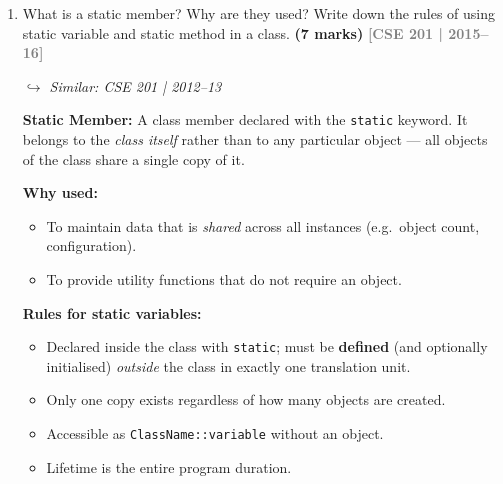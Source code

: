 \documentclass[12pt,a3paper]{article}
\newcommand{\yr}[1]{\hfill\textcolor{gray}{\small\textbf{[#1]}}}
\newcommand{\mk}[1]{\textcolor{orange!70!black}{\small\textbf{(#1 marks)}}}
\newcommand{\variant}[1]{\par\vspace{1pt}\textcolor{blue!50!black}%
  {\footnotesize\textit{$\hookrightarrow$ Similar: #1}}}
\begin{document}
\begin{enumerate}
\begin{tcolorbox}[enhanced,breakable,ansbox,colback=cB!4,colframe=cB,
  boxrule=0.8pt,arc=5pt,
  title={\textbf{Answer}},fonttitle=\bfseries\color{white},colbacktitle=cB]
\textbf{Why both are necessary:}
\begin{itemize}[itemsep=2pt]
  \item \textbf{Backward compatibility with C:} C code using
    \texttt{struct} compiles unchanged in C++.  Removing
    \texttt{struct} would break C compatibility.
  \item \textbf{Semantic clarity:} Using \texttt{struct} signals to
    readers that a type is a simple data aggregate (e.g.\ a
    \texttt{Point}, a \texttt{Color}), while \texttt{class} signals
    a fully encapsulated object.  This is a \emph{convention} that
    improves code readability.
\end{itemize}

\end{tcolorbox}

\item What is a static member? Why are they used? Write down the rules of using static variable and static method in a class. \mk{7}
\yr{CSE 201 | 2015--16}
\variant{CSE 201 | 2012--13}

\begin{tcolorbox}[enhanced,breakable,ansbox,colback=cB!4,colframe=cB,
  boxrule=0.8pt,arc=5pt,
  title={\textbf{Answer}},fonttitle=\bfseries\color{white},colbacktitle=cB]

\textbf{Static Member:} A class member declared with the
\texttt{static} keyword.  It belongs to the \emph{class itself}
rather than to any particular object --- all objects of the class
share a single copy of it.

\textbf{Why used:}
\begin{itemize}[itemsep=2pt]
  \item To maintain data that is \emph{shared} across all instances
    (e.g.\ object count, configuration).
  \item To provide utility functions that do not require an object.
\end{itemize}

\medskip
\textbf{Rules for static variables:}
\begin{itemize}[itemsep=2pt]
  \item Declared inside the class with \texttt{static}; must be
    \textbf{defined} (and optionally initialised) \emph{outside} the
    class in exactly one translation unit.
  \item Only one copy exists regardless of how many objects are created.
  \item Accessible as \texttt{ClassName::variable} without an object.
  \item Lifetime is the entire program duration.
\end{itemize}


\end{tcolorbox}
\end{enumerate}
\end{document}

